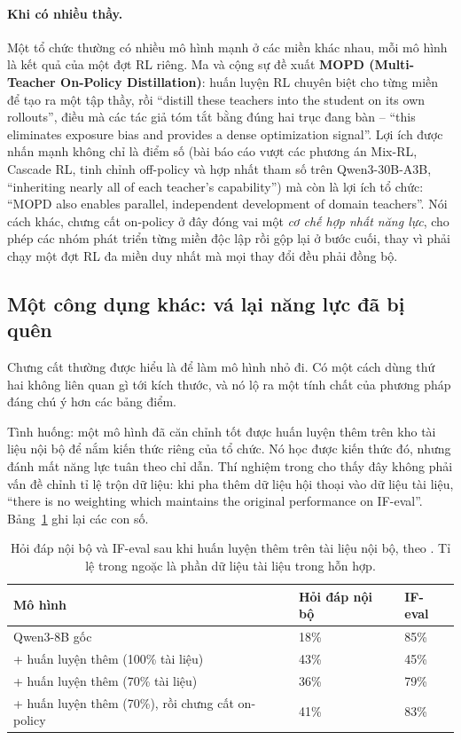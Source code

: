 \paragraph{Khi có nhiều thầy.} Một tổ chức thường có nhiều mô hình mạnh ở các miền khác nhau, mỗi mô hình là kết quả của một đợt RL riêng. Ma và cộng sự \cite{ma2026mopd} đề xuất \textbf{MOPD (Multi-Teacher On-Policy Distillation)}: huấn luyện RL chuyên biệt cho từng miền để tạo ra một tập thầy, rồi ``distill these teachers into the student on its own rollouts'', điều mà các tác giả tóm tắt bằng đúng hai trục đang bàn -- ``this eliminates exposure bias and provides a dense optimization signal''. Lợi ích được nhấn mạnh không chỉ là điểm số (bài báo cáo vượt các phương án Mix-RL, Cascade RL, tinh chỉnh off-policy và hợp nhất tham số trên Qwen3-30B-A3B, ``inheriting nearly all of each teacher's capability'') mà còn là lợi ích tổ chức: ``MOPD also enables parallel, independent development of domain teachers''. Nói cách khác, chưng cất on-policy ở đây đóng vai một \emph{cơ chế hợp nhất năng lực}, cho phép các nhóm phát triển từng miền độc lập rồi gộp lại ở bước cuối, thay vì phải chạy một đợt RL đa miền duy nhất mà mọi thay đổi đều phải đồng bộ.

\subsection{Một công dụng khác: vá lại năng lực đã bị quên}
\label{ssec:opd_personalization}

Chưng cất thường được hiểu là để làm mô hình nhỏ đi. Có một cách dùng thứ hai không liên quan gì tới kích thước, và nó lộ ra một tính chất của phương pháp đáng chú ý hơn các bảng điểm.

Tình huống: một mô hình đã căn chỉnh tốt được huấn luyện thêm trên kho tài liệu nội bộ để nắm kiến thức riêng của tổ chức. Nó học được kiến thức đó, nhưng đánh mất năng lực tuân theo chỉ dẫn. Thí nghiệm trong \cite{lu2025opd} cho thấy đây không phải vấn đề chỉnh tỉ lệ trộn dữ liệu: khi pha thêm dữ liệu hội thoại vào dữ liệu tài liệu, ``there is no weighting which maintains the original performance on IF-eval''. Bảng~\ref{tab:opd_personalization} ghi lại các con số.

\begin{table}[H]
\centering\small
\caption{Hỏi đáp nội bộ và IF-eval sau khi huấn luyện thêm trên tài liệu nội bộ, theo \cite{lu2025opd}. Tỉ lệ trong ngoặc là phần dữ liệu tài liệu trong hỗn hợp.}
\label{tab:opd_personalization}
\begin{tabularx}{\textwidth}{@{}Xll@{}}
\toprule
\textbf{Mô hình} & \textbf{Hỏi đáp nội bộ} & \textbf{IF-eval} \\
\midrule
Qwen3-8B gốc & 18\% & 85\% \\
\quad + huấn luyện thêm (100\% tài liệu) & 43\% & 45\% \\
\quad + huấn luyện thêm (70\% tài liệu) & 36\% & 79\% \\
\quad + huấn luyện thêm (70\%), rồi chưng cất on-policy & 41\% & 83\% \\
\bottomrule
\end{tabularx}
\end{table}

